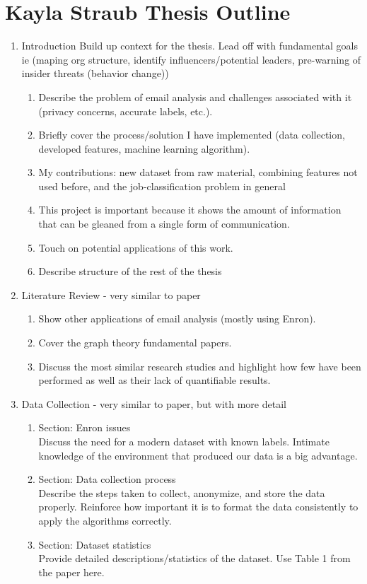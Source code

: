 \documentclass[12pt,dvips]{report}
\begin{document}
\section*{Kayla Straub Thesis Outline}
\begin{enumerate}
\item Introduction 
Build up context for the thesis. 
Lead off with fundamental goals ie (maping org structure, identify influencers/potential leaders, pre-warning of insider threats (behavior change))
\begin{enumerate}
\item Describe the problem of email analysis and challenges associated with it (privacy concerns, accurate labels, etc.).  
\item Briefly cover the process/solution I have implemented (data collection, developed features, machine learning algorithm).
\item My contributions: new dataset from raw material, combining features not used before, and the job-classification problem in general 
\item This project is important because it shows the amount of information that can be gleaned from a single form of communication. 
\item Touch on potential applications of this work.
\item Describe structure of the rest of the thesis
\end{enumerate}

\item Literature Review - very similar to paper
\begin{enumerate}
\item Show other applications of email analysis (mostly using Enron).  
\item Cover the graph theory fundamental papers.  
\item Discuss the most similar research studies and highlight how few have been performed as well as their lack of quantifiable results.
\end{enumerate}

\item Data Collection - very similar to paper, but with more detail
\begin{enumerate}
\item Section: Enron issues\\
Discuss the need for a modern dataset with known labels.  Intimate knowledge of the environment that produced our data is a big advantage.  
\item Section: Data collection process \\ Describe the steps taken to collect, anonymize, and store the data properly.  Reinforce how important it is to format the data consistently to apply the algorithms correctly.
\item Section: Dataset statistics\\ Provide detailed descriptions/statistics of the dataset.  Use Table 1 from the paper here.
\end{enumerate}


\end{enumerate}
\end{document}
